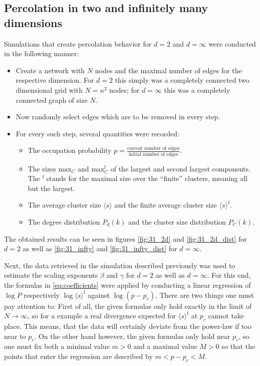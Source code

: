 \documentclass{scrartcl}
\begin{document}
\subsection{Percolation in two and infinitely many dimensions}
 Simulations that create percolation behavior for $d=2$
and $d=\infty$ were conducted in the following manner:
\begin{itemize}
    \item Create a network with $N$ nodes and the maximal number of edges
        for the respective dimension. For $d=2$ this simply was a completely
        connected two dimensional grid with $N = n^2$ nodes; for $d=\infty$
        this was a completely connected graph of size $N$.
    \item Now randomly select edges which are to be removed in every step.
    \item For every such step, several quantities were recorded: 
    \begin{itemize}
        \item The occupation probability $p = \frac{\text{current number of
            edges}}{\text{initial number of edges}}$.
        \item The sizes $\mathrm{max}_C$ and $\mathrm{max}_C^\mathrm{f}$ of the largest and
            second largest components. The $^\mathrm{f}$ stands for the
            maximal size over the \enquote{finite} clusters, meaning all
            but the largest.
        \item The average cluster size $\langle s\rangle$ and the finite 
            average cluster size $\langle s\rangle^\mathrm{f}$.
        \item The degree distribution $P_\mathrm{d}(k)$ and the cluster size distribution $P_C(k)$.
    \end{itemize}
\end{itemize}
The obtained results can be seen in figures \ref{fig:31_2d} and
\ref{fig:31_2d_dist} for $d=2$ as well as \ref{fig:31_infty} and
\ref{fig:31_infty_dist} for $d=\infty$.

 Next, the data retrieved in the simulation described
previously was used to estimate the scaling exponents $\beta$ and $\gamma$
for $d=2$ as well as $d=\infty$. For this end, the formulas in
\eqref{eq:coefficients} were applied by conducting a linear regression of
$\log P$ respectively $\log \langle s\rangle^\mathrm{f}$ against
$\log(p-p_c)$.
There are two things one must pay attention to: First of all, the given
formulas only hold exactly in the limit of $N\to\infty$, so for a example
a real divergence expected for $\langle s\rangle^\mathrm{f}$ at $p_c$
cannot take place. This means, that the data will certainly deviate from
the power-law if too near to $p_c$. On the other hand however, the given
formulas only hold near $p_c$, so one must fix both a minimal value $m>0$
and a maximal value $M>0$ so that the points that enter the regression are
described by $m < p-p_c < M$. 
\end{document}
